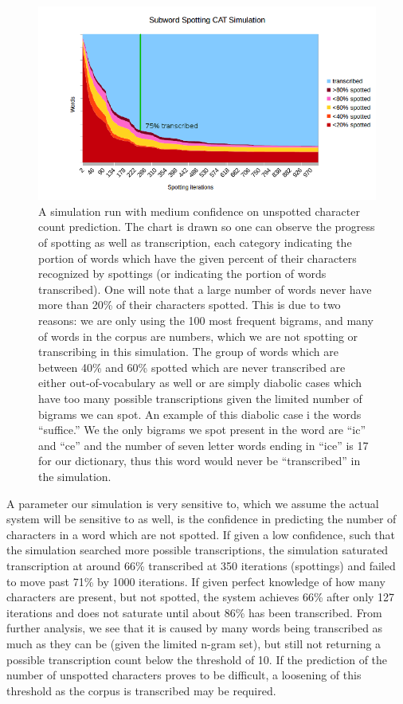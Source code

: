 \documentclass[ms]{byuprop}
\begin{document}
\begin{figure}
    \centering
    \includegraphics[width=1.0\textwidth]{simulationGraph_line}
    \caption{A simulation run with medium confidence on unspotted character count prediction. The chart is drawn so one can observe the progress of spotting as well as transcription, each category indicating the portion of words which have the given percent of their characters recognized by spottings (or indicating the portion of words transcribed). One will note that a large number of words never have more than 20\% of their characters spotted. This is due to two reasons: we are only using the 100 most frequent bigrams, and many of words in the corpus are numbers, which we are not spotting or transcribing in this simulation. The group of words which are between 40\% and 60\% spotted which are never transcribed are either out-of-vocabulary as well or are simply diabolic cases which have too many possible transcriptions given the limited number of bigrams we can spot. An example of this diabolic case i the words ``suffice.'' We the only bigrams we spot present in the word are ``ic'' and ``ce'' and the number of seven letter words ending in ``ice'' is 17 for our dictionary, thus this word would never be ``transcribed'' in the simulation.}
    \label{fig:fullSim}
\end{figure}

A parameter our simulation is very sensitive to, which we assume the actual system will be sensitive to as well, is the confidence in predicting the number of characters in a word which are not spotted. If given a low confidence, such that the simulation searched more possible transcriptions, the simulation saturated transcription at around 66\% transcribed at 350 iterations (spottings) and failed to move past 71\% by 1000 iterations. If given perfect knowledge of how many characters are present, but not spotted, the system achieves 66\% after only 127 iterations and does not saturate until about 86\% has been transcribed. From further analysis, we see that it is caused by many words being transcribed as much as they can be (given the limited n-gram set), but still not returning a possible transcription count below the threshold of 10. If the prediction of the number of unspotted characters proves to be difficult, a loosening of this threshold as the corpus is transcribed may be required.
\end{document}
